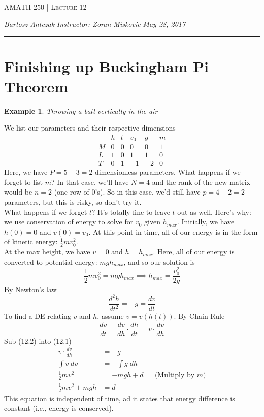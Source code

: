 \documentclass{report}
\newcommand{\lectureNum}{12}
\newcommand{\curDate}{May 28, 2017}
\newcommand{\course}{AMATH 250}
\newcommand{\instructor}{Zoran Miskovic}
\newtheorem{ex}{Example}[section]
\begin{document}
\begin{center}
\begin{Large}
\textsc{\course{} | Lecture \lectureNum{}}
\end{Large}
\end{center} 
\noindent \textit{Bartosz Antczak} \hfill
\textit{Instructor: \instructor{}} \hfill
\textit{\curDate{}}
\rule{\textwidth}{0.4pt}
\section{Finishing up Buckingham Pi Theorem}
\begin{ex}
Throwing a ball vertically in the air
\end{ex}\noindent
We list our parameters and their respective dimensions
$$\begin{matrix}
& h & t & v_0 & g & m  \\
M & 0 & 0 & 0 & 0 & 1 \\
L & 1 & 0 & 1 & 1 & 0 \\
T & 0 & 1 & -1 & -2 & 0
\end{matrix}$$
Here, we have $P = 5-3 = 2$ dimensionless parameters.
What happens if we forget to list $m$? In that case, we'll have $N = 4$ and the rank of the new matrix would be $n=2$ (one row of 0's). So in this case, we'd still have $p = 4-2 = 2$ parameters, but this is risky, so don't try it. \\
What happens if we forget $t$? It's totally fine to leave $t$ out as well. Here's why: we use conservation of energy to solve for $v_0$ given $h_{max}$. Initially, we have $h(0) = 0$ and $v(0) = v_0$. At this point in time, all of our energy is in the form of kinetic energy: $\frac{1}{2}mv_0^2$. \\
At the max height, we have $v = 0$ and $h = h_{max}$. Here, all of our energy is converted to potential energy: $mgh_{max}$, and so our solution is
$$\frac{1}{2}mv_0^2 = mgh_{max} \implies h_{max} = \frac{v_0^2}{2g}$$
By Newton's law
\begin{equation}
\frac{d^2h}{dt^2} = -g = \frac{dv}{dt}
\end{equation}
To find a DE relating $v$ and $h$, assume $v = v(h(t))$. By Chain Rule
\begin{equation}
\frac{dv}{dt} = \frac{dv}{dh}\cdot \frac{dh}{dt} = v\cdot \frac{dv}{dh}
\end{equation}
Sub (12.2) into (12.1)
\begin{align}
v\cdot \frac{dv}{dh} &= - g \\
\int v \; dv &= -\int g \; dh \\
\frac{1}{2}mv^2 &= -mgh + d && \text{(Multiply by }m)\\
\frac{1}{2}mv^2 + mgh &= d
\end{align}
This equation is independent of time, ad it states that energy difference is constant (i.e., energy is conserved).
\end{document}
